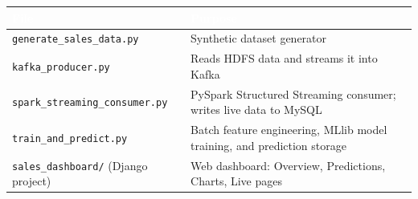 \documentclass[11pt]{article}
\begin{document}
\renewcommand{\arraystretch}{1.25}
\begin{table}[H]
\centering
\begin{tabularx}{\textwidth}{@{}>{\raggedright\arraybackslash}p{5.4cm}>{\raggedright\arraybackslash}X@{}}
\toprule
\rowcolor{navy}\textcolor{white}{\textbf{File}} & \textcolor{white}{\textbf{Purpose}} \\
\midrule
\texttt{generate\_sales\_data.py} & Synthetic dataset generator \\
\rowcolor{rowalt} \texttt{kafka\_producer.py} & Reads HDFS data and streams it into Kafka \\
\texttt{spark\_streaming\_consumer.py} & PySpark Structured Streaming consumer; writes live data to MySQL \\
\rowcolor{rowalt} \texttt{train\_and\_predict.py} & Batch feature engineering, MLlib model training, and prediction storage \\
\texttt{sales\_dashboard/} (Django project) & Web dashboard: Overview, Predictions, Charts, Live pages \\
\bottomrule
\end{tabularx}
\end{table}
\renewcommand{\arraystretch}{1}
\end{document}
